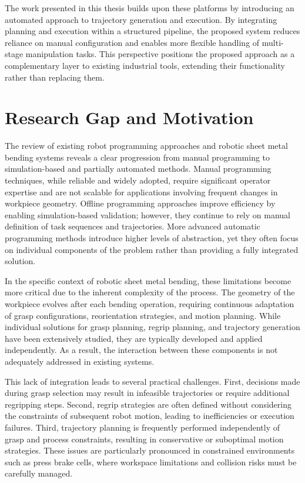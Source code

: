 The work presented in this thesis builds upon these platforms by introducing an automated approach to trajectory generation and execution. By integrating planning and execution within a structured pipeline, the proposed system reduces reliance on manual configuration and enables more flexible handling of multi-stage manipulation tasks.
This perspective positions the proposed approach as a complementary layer to existing industrial tools, extending their functionality rather than replacing them.


\section{Research Gap and Motivation}
\label{sec:research-gap-motivation}

The review of existing robot programming approaches and robotic sheet metal bending systems reveals a clear progression from manual programming to simulation-based and partially automated methods. Manual programming techniques, while reliable and widely adopted, require significant operator expertise and are not scalable for applications involving frequent changes in workpiece geometry. Offline programming approaches improve efficiency by enabling simulation-based validation; however, they continue to rely on manual definition of task sequences and trajectories. More advanced automatic programming methods introduce higher levels of abstraction, yet they often focus on individual components of the problem rather than providing a fully integrated solution.

In the specific context of robotic sheet metal bending, these limitations become more critical due to the inherent complexity of the process. The geometry of the workpiece evolves after each bending operation, requiring continuous adaptation of grasp configurations, reorientation strategies, and motion planning. While individual solutions for grasp planning, regrip planning, and trajectory generation have been extensively studied, they are typically developed and applied independently. As a result, the interaction between these components is not adequately addressed in existing systems.

This lack of integration leads to several practical challenges. First, decisions made during grasp selection may result in infeasible trajectories or require additional regripping steps. Second, regrip strategies are often defined without considering the constraints of subsequent robot motion, leading to inefficiencies or execution failures. Third, trajectory planning is frequently performed independently of grasp and process constraints, resulting in conservative or suboptimal motion strategies. These issues are particularly pronounced in constrained environments such as press brake cells, where workspace limitations and collision risks must be carefully managed.

